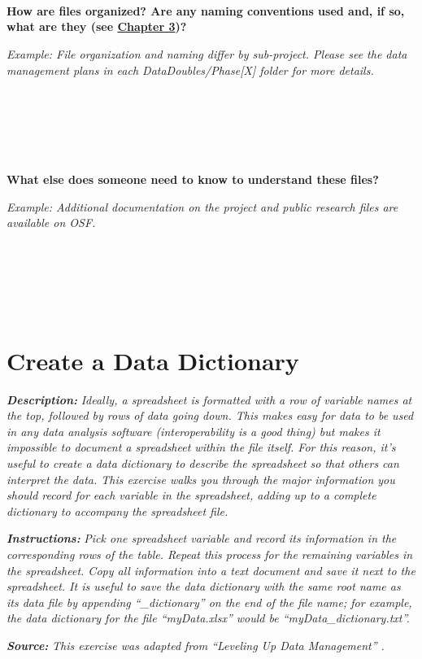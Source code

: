 \documentclass[
]{book}
\begin{document}
~

~

~

\textbf{How are files organized? Are any naming conventions used and, if so, what are they (see \protect\hyperlink{file-organization-and-naming}{Chapter 3})?}

\emph{Example: File organization and naming differ by sub-project. Please see the data management plans in each DataDoubles/Phase{[}X{]} folder for more details.}

~

~

~

\textbf{What else does someone need to know to understand these files?}

\emph{Example: Additional documentation on the project and public research files are available on OSF.}

~

~

~

\hypertarget{data-dictionary}{%
\section{Create a Data Dictionary}\label{data-dictionary}}

\textbf{\emph{Description:}} \emph{Ideally, a spreadsheet is formatted with a row of variable names at the top, followed by rows of data going down. This makes easy for data to be used in any data analysis software (interoperability is a good thing) but makes it impossible to document a spreadsheet within the file itself. For this reason, it's useful to create a data dictionary to describe the spreadsheet so that others can interpret the data. This exercise walks you through the major information you should record for each variable in the spreadsheet, adding up to a complete dictionary to accompany the spreadsheet file.}

\textbf{\emph{Instructions:}} \emph{Pick one spreadsheet variable and record its information in the corresponding rows of the table. Repeat this process for the remaining variables in the spreadsheet. Copy all information into a text document and save it next to the spreadsheet. It is useful to save the data dictionary with the same root name as its data file by appending ``\_dictionary'' on the end of the file name; for example, the data dictionary for the file ``myData.xlsx'' would be ``myData\_dictionary.txt''.}

\textbf{\emph{Source:}} \emph{This exercise was adapted from ``Leveling Up Data Management'' \citep{briney_leveling_2023}.}
\end{document}
